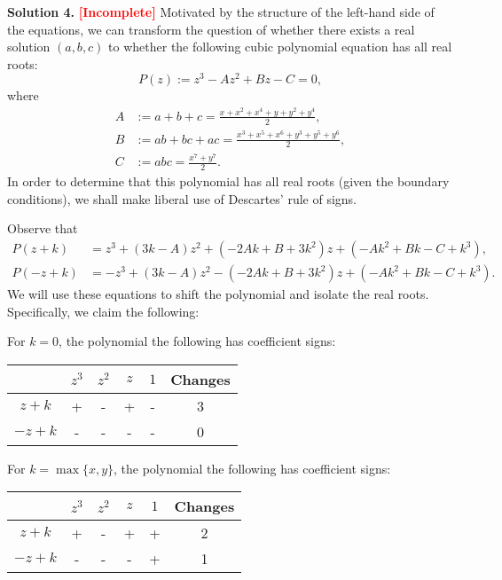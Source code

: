 \begin{solution}{4}
    \textbf{Solution 4.} \textbf{\textcolor{red}{[Incomplete]}} Motivated by the structure of the left-hand side of the equations, we can
    transform the question of whether there exists a real solution \( (a, b, c) \)
    to whether the following cubic polynomial equation has all real roots:
    \[
        P(z) := z^3 - Az^2 + Bz - C = 0
    ,\]
    where
    \begin{align*}
        A &:= a + b + c = \frac{x + x^2 + x^4 + y + y^2 + y^4}{2}, \\
        B &:= ab + bc + ac = \frac{x^3 + x^5 + x^6 + y^3 + y^5 + y^6}{2}, \\
        C &:= abc = \frac{x^7 + y^7}{2}
    .\end{align*}
    In order to determine that this polynomial has all real roots (given the
    boundary conditions), we shall make liberal use of Descartes' rule of signs.

    Observe that
    \begin{align*}
        P(z + k) &= z^3 + (3k - A) z^2 + (-2Ak + B + 3k^2) z + (-Ak^2 + Bk - C + k^3), \\
        P(-z + k) &= -z^3 + (3k - A) z^2 - (-2Ak + B + 3k^2) z + (-Ak^2 + Bk - C + k^3)
    .\end{align*}
    We will use these equations to shift the polynomial and isolate the real roots.
    Specifically, we claim the following:

    For \( k = 0 \), the polynomial the following has coefficient signs:
    \begin{center}
        \begin{tabular}{c|c|c|c|c|c}
            & \( z^3 \) & \( z^2 \) & \( z \) & \( 1 \) & Changes \\
            \hline
            \( z + k \) & + & - & + & - & 3 \\
            \( -z + k \) & - & - & - & - & 0 
        \end{tabular}
    \end{center}

    For \( k = \max \{ x, y \} \), the polynomial the following has coefficient signs:
    \begin{center}
        \begin{tabular}{c|c|c|c|c|c}
            & \( z^3 \) & \( z^2 \) & \( z \) & \( 1 \) & Changes \\
            \hline
            \( z + k \) & + & - & + & + & 2 \\
            \( -z + k \) & - & - & - & + & 1 
        \end{tabular}
    \end{center}


\end{solution}
